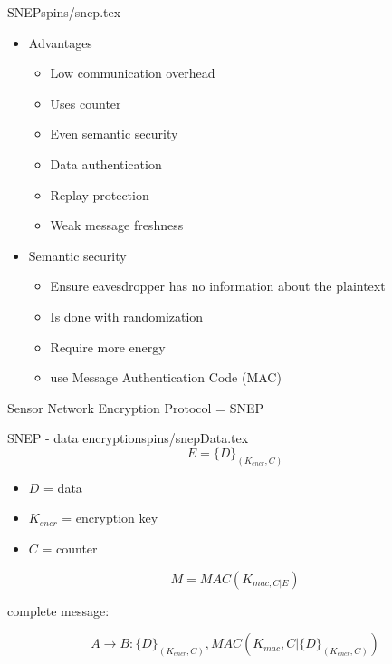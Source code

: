 \begin{notedFrame}{SNEP}{spins/snep.tex}
    \begin{itemize}
        \item Advantages
        \begin{itemize}
            \item Low communication overhead
            \item Uses counter
            \item Even semantic security
            \item Data authentication
            \item Replay protection
            \item Weak message freshness
        \end{itemize}
        \item Semantic security
        \begin{itemize}
            \item Ensure eavesdropper has no information about the plaintext
            \item Is done with randomization
            \item Require more energy
            \item use Message Authentication Code (MAC)
        \end{itemize}
    \end{itemize}

    Sensor Network Encryption Protocol = SNEP
\end{notedFrame}

\begin{notedFrame}{SNEP - data encryption}{spins/snepData.tex}
    \begin{equation}
        E=\{D\}_{(K_{encr},C)}
    \end{equation}

    \begin{itemize}
        \item $D$ = data
        \item $K_{encr}$ = encryption key
        \item $C$ = counter
    \end{itemize}

    \begin{equation}
        M = MAC(K_{mac, C | E})
    \end{equation}

    complete message:

    \begin{equation}
        A \rightarrow B : \{D\}_{(K_{encr} ,C)}, MAC(K_{mac}, C | \{D\}_{(K_{encr}, C)})
    \end{equation}
\end{notedFrame}

